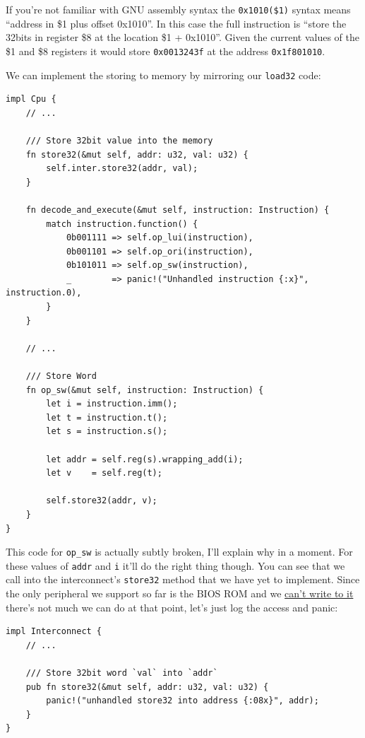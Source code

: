 \documentclass[a4paper]{article}
\newcommand{\code}[1] {\texttt{#1}}
\begin{document}
If you're not familiar with GNU assembly syntax the
\code{0x1010(\$1)} syntax means ``address in \$1 plus offset
0x1010''. In this case the full instruction is ``store the 32bits in
register \$8 at the location \$1 + 0x1010''. Given the current values
of the \$1 and \$8 registers it would store \code{0x0013243f} at the
address \code{0x1f801010}.

We can implement the storing to memory by mirroring our
\code{load32} code:

\begin{lstlisting}
impl Cpu {
    // ...

    /// Store 32bit value into the memory
    fn store32(&mut self, addr: u32, val: u32) {
        self.inter.store32(addr, val);
    }

    fn decode_and_execute(&mut self, instruction: Instruction) {
        match instruction.function() {
            0b001111 => self.op_lui(instruction),
            0b001101 => self.op_ori(instruction),
            0b101011 => self.op_sw(instruction),
            _        => panic!("Unhandled instruction {:x}", instruction.0),
        }
    }

    // ...

    /// Store Word
    fn op_sw(&mut self, instruction: Instruction) {
        let i = instruction.imm();
        let t = instruction.t();
        let s = instruction.s();

        let addr = self.reg(s).wrapping_add(i);
        let v    = self.reg(t);

        self.store32(addr, v);
    }
}
\end{lstlisting}

This code for \code{op\_sw} is actually subtly broken, I'll explain
why in a moment. For these values of \code{addr} and \code{i}
it'll do the right thing though. You can see that we call into the
interconnect's \code{store32} method that we have yet to
implement. Since the only peripheral we support so far is the BIOS ROM
and we
\href{https://github.com/simias/psx-hardware-tests/blob/master/tests/bios_write/main.s}{can't
  write to it} there's not much we can do at that point, let's just
log the access and panic:

\begin{lstlisting}
impl Interconnect {
    // ...

    /// Store 32bit word `val` into `addr`
    pub fn store32(&mut self, addr: u32, val: u32) {
        panic!("unhandled store32 into address {:08x}", addr);
    }
}
\end{lstlisting}
\end{document}
